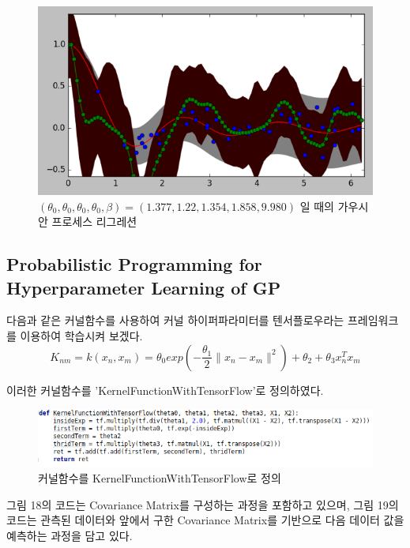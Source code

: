 \documentclass[a4paper]{oblivoir}
\begin{document}
\begin{figure}[ht] \centering 
\includegraphics[scale=0.6]{fig12_15.png} 
\caption{$(\theta_{0},\theta_{0},\theta_{0},\theta_{0}, \beta ) = (1.377, 1.22, 1.354, 1.858, 9.980)$ 일 때의 가우시안 프로세스 리그레션}
\label{fig:12-16}
\end{figure}

\subsection{Probabilistic Programming for Hyperparameter Learning of GP}

다음과 같은 커널함수를 사용하여 커널 하이퍼파라미터를 텐서플로우라는 프레임워크를 이용하여 학습시켜 보겠다.
\begin{equation}
K_{nm}= k(x_{n}, x_{m}) =\theta_{0}exp \left( -\frac{\theta_{1}}{2} \parallel x_{n} - x_{m} \parallel^{2} \right) +\theta_{2} + \theta_{3}x_{n}^{T}x_{m}
\label{eq:12-36}
\end{equation} 

이러한 커널함수를 'KernelFunctionWithTensorFlow'로 정의하였다.

\begin{figure}[ht] \centering 
\includegraphics[scale=0.6]{fig12_18.png} 
\caption{커널함수를 KernelFunctionWithTensorFlow로 정의}
\label{fig:12-17}
\end{figure}

그림 18의 코드는 Covariance Matrix를 구성하는 과정을 포함하고 있으며, 그림 19의 코드는 관측된 데이터와 앞에서 구한 Covariance Matrix를 기반으로 다음 데이터 값을 예측하는 과정을 담고 있다.
\end{document}
